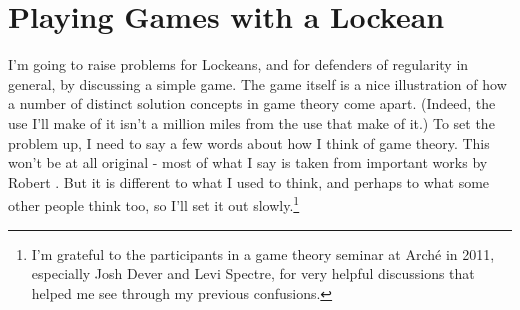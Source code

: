 %
%
%

\section{Playing Games with a Lockean}

I'm going to raise problems for Lockeans, and for defenders of regularity in general, by discussing a simple game. The game itself is a nice illustration of how a number of distinct solution concepts in game theory come apart. (Indeed, the use I'll make of it isn't a million miles from the use that  \citet{KohlbergMertens1986} make of it.) To set the problem up, I need to say a few words about how I think of game theory. This won't be at all original - most of what I say is taken from important works by Robert \citet{Stalnaker1994, Stalnaker1996, Stalnaker1998, Stalnaker1999}. But it is different to what I used to think, and perhaps to what some other people think too, so I'll set it out slowly.\footnote{I'm grateful to the participants in a game theory seminar at Arch\'e in 2011, especially Josh Dever and Levi Spectre, for very helpful discussions that helped me see through my previous confusions.}

